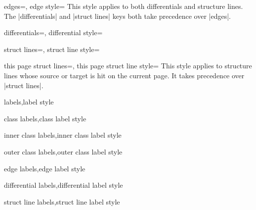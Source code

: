 \documentclass{ltxdoc}
\begin{document}
\begin{sseqdata}[name=ex1,degree={#1}{1-#1}]
\begin{keylist}{edges=, edge style=}
This style applies to both differentials and structure lines. The |differentials| and |struct lines| keys both take precedence over |edges|.
\end{keylist}

\begin{keylist}{differentials=, differential style=} 

\end{keylist}

\begin{keylist}{struct lines=, struct line style=} 

\end{keylist}

\begin{keylist}{this page struct lines=, this page struct line style=}
This style applies to structure lines whose source or target is hit on the current page. It takes precedence over |struct lines|.
\end{keylist}

\begin{keylist}{labels,label style}

\end{keylist}

\begin{keylist}{class labels,class label style}

\end{keylist}

\begin{keylist}{inner class labels,inner class label style}

\end{keylist}

\begin{keylist}{outer class labels,outer class label style}

\end{keylist}


\begin{keylist}{edge labels,edge label style}

\end{keylist}

\begin{keylist}{differential labels,differential label style}

\end{keylist}

\begin{keylist}{struct line labels,struct line label style}


\end{keylist}
\end{sseqdata}
\end{document}
